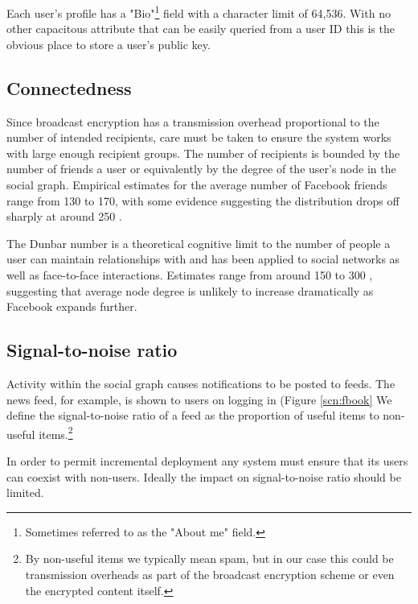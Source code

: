 Each user's profile has a "Bio"\footnote{Sometimes referred to as the "About me" field.} field with a character limit of 64,536. With no other capacitous attribute that can be easily queried from a user ID this is the obvious place to store a user's public key.

    
\subsection{Connectedness}
\label{sec:cness}

Since broadcast encryption has a transmission overhead proportional to the number of intended recipients, care must be taken to ensure the system works with large enough recipient groups. The number of recipients is bounded by the number of friends a user or equivalently by the degree of the user's node in the social graph. Empirical estimates for the average number of Facebook friends range from 130 to 170, with some evidence suggesting the distribution drops off sharply at around 250 \cite{fb-factsheet} \cite{fb-connectedness}.

The Dunbar number is a theoretical cognitive limit to the number of people a user can maintain relationships with and has been applied to social networks as well as face-to-face interactions. Estimates range from around 150 to 300 \cite{dunbar} \cite{socnetsize}, suggesting that average node degree is unlikely to increase dramatically as Facebook expands further.


\subsection{Signal-to-noise ratio}
\label{sec:signoise}

Activity within the social graph causes notifications to be posted to feeds. The news feed, for example, is shown to users on logging in (Figure \ref{scn:fbook}  We define the signal-to-noise ratio of a feed as the proportion of useful items to non-useful items.\footnote{By non-useful items we typically mean spam, but in our case this could be transmission overheads as part of the broadcast encryption scheme or even the encrypted content itself.}

In order to permit incremental deployment any system must ensure that its users can coexist with non-users. Ideally the impact on signal-to-noise ratio should be limited.

